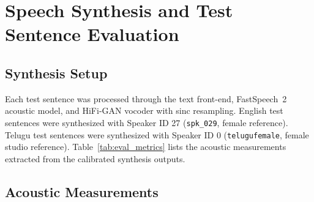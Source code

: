 \documentclass[11pt,a4paper]{report}
\begin{document}
\FloatBarrier
\vspace{1.5em}

\chapter{Speech Synthesis and Test Sentence Evaluation}

\section{Synthesis Setup}
Each test sentence was processed through the text front-end, FastSpeech~2 acoustic model, and HiFi-GAN vocoder with sinc resampling. English test sentences were synthesized with Speaker ID 27 (\texttt{spk\_029}, female reference). Telugu test sentences were synthesized with Speaker ID 0 (\texttt{telugufemale}, female studio reference). Table~\ref{tab:eval_metrics} lists the acoustic measurements extracted from the calibrated synthesis outputs.

\section{Acoustic Measurements}
\end{document}
